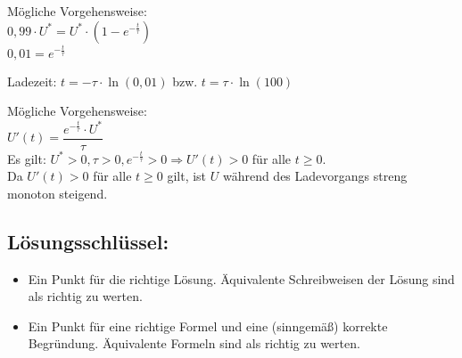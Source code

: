 \begin{langesbeispiel}
{\begin{enumerate}
Mögliche Vorgehensweise:\\
$0,99\cdot U^*=U^*\cdot\left(1-e^{-\frac{t}{\tau}}\right)$\\
$0,01=e^{-\frac{t}{\tau}}$

Ladezeit: $t=-\tau\cdot\ln(0,01)$ bzw. $t=\tau\cdot\ln(100)$\leer

Mögliche Vorgehensweise:\\
$U'(t)=\dfrac{e^{-\frac{t}{\tau}}\cdot U^*}{\tau}$\\
Es gilt: $U^*>0, \tau >0, e^{-\frac{t}{\tau}}>0 \Rightarrow U'(t)>0$ für alle $t\geq 0$.\\
Da $U'(t)>0$ für alle $t\geq 0$ gilt, ist $U$ während des Ladevorgangs streng monoton steigend.

\subsection{Lösungsschlüssel:}
\begin{itemize}
\item Ein Punkt für die richtige Lösung. Äquivalente Schreibweisen der Lösung sind als richtig zu werten.
\item Ein Punkt für eine richtige Formel und eine (sinngemäß) korrekte Begründung. Äquivalente Formeln sind als richtig zu werten.
\end{itemize}

\end{enumerate}}
\end{langesbeispiel}